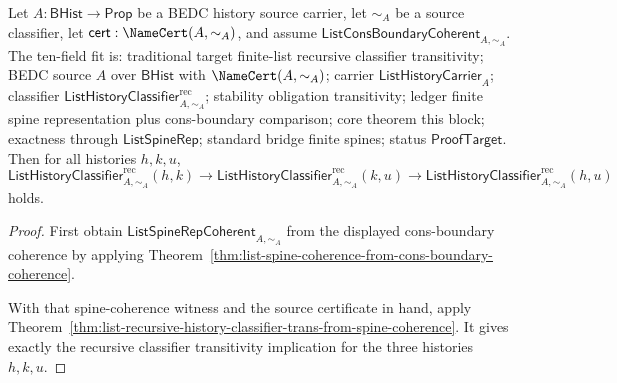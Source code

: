 \begin{theorem}
\label{thm:list-recursive-history-classifier-trans-from-cons-boundary-coherence}
Let $A:\mathsf{BHist}\to\mathsf{Prop}$ be a BEDC history source carrier, let
$\sim_A$ be a source classifier, let $\mathsf{cert}:\NameCert(A,\sim_A)$, and
assume $\mathsf{ListConsBoundaryCoherent}_{A,\sim_A}$. The ten-field fit is:
traditional target finite-list recursive classifier transitivity; BEDC source
$A$ over $\mathsf{BHist}$ with $\NameCert(A,\sim_A)$; carrier
$\mathsf{ListHistoryCarrier}_A$; classifier
$\mathsf{ListHistoryClassifier}^{\mathrm{rec}}_{A,\sim_A}$; stability
obligation transitivity; ledger finite spine representation plus cons-boundary
comparison; core theorem this block; exactness through $\mathsf{ListSpineRep}$;
standard bridge finite spines; status $\mathsf{ProofTarget}$. Then for all
histories $h,k,u$,
$$
\mathsf{ListHistoryClassifier}^{\mathrm{rec}}_{A,\sim_A}(h,k)\to
\mathsf{ListHistoryClassifier}^{\mathrm{rec}}_{A,\sim_A}(k,u)\to
\mathsf{ListHistoryClassifier}^{\mathrm{rec}}_{A,\sim_A}(h,u)
$$
holds.
\end{theorem}
\begin{proof}
First obtain $\mathsf{ListSpineRepCoherent}_{A,\sim_A}$ from the displayed
cons-boundary coherence by applying
Theorem~\ref{thm:list-spine-coherence-from-cons-boundary-coherence}.

With that spine-coherence witness and the source certificate in hand, apply
Theorem~\ref{thm:list-recursive-history-classifier-trans-from-spine-coherence}.
It gives exactly the recursive classifier transitivity implication for the
three histories $h,k,u$.
\end{proof}

